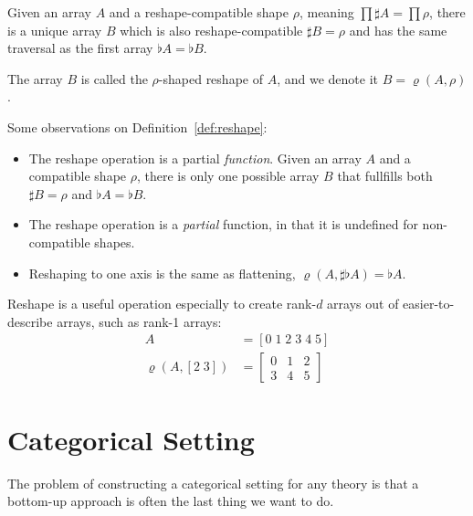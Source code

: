 \documentclass{DIKU-report-variant}
\begin{document}
\begin{definition}
  \label{def:reshape}
  Given an array \(A\) and a reshape-compatible shape \(\rho\), meaning \(\prod \sharp A = \prod\rho\),
  there is a unique array \(B\) which is also reshape-compatible \(\sharp B = \rho\) and
  has the same traversal as the first array \(\flat A = \flat B\).
  
  The array \(B\) is called the \(\rho\)-shaped reshape of \(A\), and we denote
  it \(B = \varrho(A, \rho)\).
\end{definition}

\begin{observation}
  \label{ob:reshape}
  Some observations on Definition~\ref{def:reshape}:
  \begin{itemize}
    \item The reshape operation is a partial \emph{function}. Given an array \(A\) and a compatible
      shape \(\rho\), there is only one possible array \(B\) that fullfills
      both \(\sharp B = \rho\) and \(\flat A = \flat B\).
    \item The reshape operation is a \emph{partial} function, in that it is undefined for non-compatible
      shapes.
    \item Reshaping to one axis is the same as flattening, \(\varrho(A, \sharp \flat A) = \flat A\).
  \end{itemize}
\end{observation}

\begin{example}
  \label{ex:reshape}
  Reshape is a useful operation especially to create rank-\(d\) arrays
  out of easier-to-describe arrays, such as rank-1 arrays:
  \begin{align*}
    A &= [0\; 1\; 2\; 3\; 4\; 5] \\
    \varrho(A, [2\;3]) &= \begin{bmatrix}
      0 & 1 & 2 \\
      3 & 4 & 5 
    \end{bmatrix}
  \end{align*}
\end{example}

\section{Categorical Setting}

The problem of constructing a categorical setting for any theory
is that a bottom-up approach is often the last thing we want to do.
\end{document}
